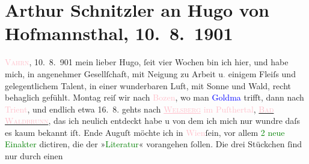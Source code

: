 

               \section[Arthur Schnitzler an Hugo von Hofmannsthal, 10. 8. 1901]{ Arthur Schnitzler an Hugo von Hofmannsthal,
                    10. 8. 1901}\nopagebreak{}\rehead{ }\normalsize\beginnumbering{} \toendnotes[C]{\smallbreak\pagebreak[2]} 
\toendnotes[C]{\smallbreak}\pstart
           \raggedleft{}{\pb}\textcolor{pink}{\textsc{Vahrn}}{}\ledrightnote{\textcolor{pink}{Vahrn}}, 10. 8. 901\pend
           \pstart
           mein lieber Hugo, ſeit vier Wochen bin ich hier, und habe mich,
                    in angenehmer Gesellſchaft, mit Neigung zu Arbeit u\textcolor{gray}{.} einigem
                    Fleiſs und gelegentlichem Talent, in einer wunderbaren Luft, mit Sonne und Wald,
                    recht behaglich gefühlt. Montag reiſ wir nach \textcolor{pink}{Bozen}{}\ledrightnote{\textcolor{pink}{Bozen}}, wo man \textcolor{blue}{Goldma{\geminationn}}{}\ledrightnote{\textcolor{blue}{Paul Goldmann}}
                    trifft, dann nach \textcolor{pink}{Trient}{}\ledrightnote{\textcolor{pink}{Trient}}, und endlich etwa
                        16. 8. gehts nach \textcolor{pink}{\uline{\textsc{Welsberg}} im Puſthertal}{}\ledrightnote{\textcolor{pink}{Welsberg-Taisten}}, \uline{\textcolor{pink}{\textsc{Bad Waldbrunn}}{}\ledrightnote{\textcolor{pink}{Wildbad Waldbrunn}}}, das ich neulich entdeckt habe u von dem ich mich nur wundre {\pb}daſs es kaum bekannt iſt. Ende
                        Auguſt möchte ich in \textcolor{pink}{Wien}{}\ledrightnote{\textcolor{pink}{Wien}}{ }ſein,
                    vor allem \textcolor{green}{2 neue
                        Einakter}{} dictiren, die der »\textcolor{green}{Literatur}{}\ledrightnote{\textcolor{green}{Literatur}}« vorangehen ſollen. Die drei Stückchen ſind nur durch einen
